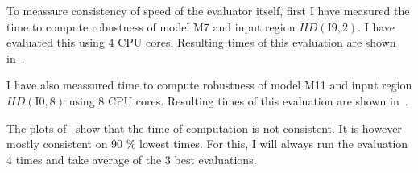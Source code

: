 To meassure consistency of speed of the evaluator itself,
first I have measured the time to compute robustness of model M7
and input region $HD(\text{I9}, 2)$. I have evaluated this
using 4 CPU cores. Resulting times of this evaluation are shown in~.

I have also meassured time to compute robustness of model M11
and input region $HD(\text{I0}, 8)$ using 8 CPU cores.
Resulting times of this evaluation are shown in~.

The plots of~ show that the time
of computation is not consistent. It is however mostly consistent on 90 \% lowest times.
For this, I will always run the evaluation 4 times and take average of the 3 best evaluations.


